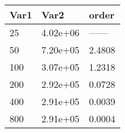 \begin{tabular}{lll}
Var1 & Var2 & order \\ 
\hline 
25 & 4.02e+06 & ------ \\ 
50 & 7.20e+05 & 2.4808 \\ 
100 & 3.07e+05 & 1.2318 \\ 
200 & 2.92e+05 & 0.0728 \\ 
400 & 2.91e+05 & 0.0039 \\ 
800 & 2.91e+05 & 0.0004 \\ 
\hline 
\end{tabular}